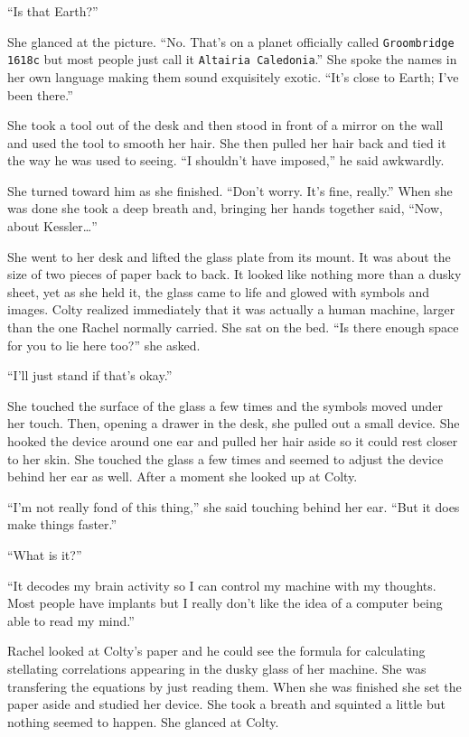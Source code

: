 ``Is that Earth?''

She glanced at the picture. ``No. That's on a planet officially called \texttt{Groombridge
  1618c} but most people just call it \texttt{Altairia Caledonia}.'' She spoke the names in her
own language making them sound exquisitely exotic. ``It's close to Earth; I've been there.''

She took a tool out of the desk and then stood in front of a mirror on the wall and used the
tool to smooth her hair. She then pulled her hair back and tied it the way he was used to
seeing. ``I shouldn't have imposed,'' he said awkwardly.

She turned toward him as she finished. ``Don't worry. It's fine, really.'' When she was done she
took a deep breath and, bringing her hands together said, ``Now, about Kessler\ldots''

She went to her desk and lifted the glass plate from its mount. It was about the size of two
pieces of paper back to back. It looked like nothing more than a dusky sheet, yet as she held
it, the glass came to life and glowed with symbols and images. Colty realized immediately that
it was actually a human machine, larger than the one Rachel normally carried. She sat on the
bed. ``Is there enough space for you to lie here too?'' she asked.

``I'll just stand if that's okay.''

She touched the surface of the glass a few times and the symbols moved under her touch. Then,
opening a drawer in the desk, she pulled out a small device. She hooked the device around one
ear and pulled her hair aside so it could rest closer to her skin. She touched the glass a few
times and seemed to adjust the device behind her ear as well. After a moment she looked up at
Colty.

``I'm not really fond of this thing,'' she said touching behind her ear. ``But it does make
things faster.''

``What is it?''

``It decodes my brain activity so I can control my machine with my thoughts. Most people have
implants but I really don't like the idea of a computer being able to read my mind.''

Rachel looked at Colty's paper and he could see the formula for calculating stellating
correlations appearing in the dusky glass of her machine. She was transfering the equations by
just reading them. When she was finished she set the paper aside and studied her device. She
took a breath and squinted a little but nothing seemed to happen. She glanced at Colty.


